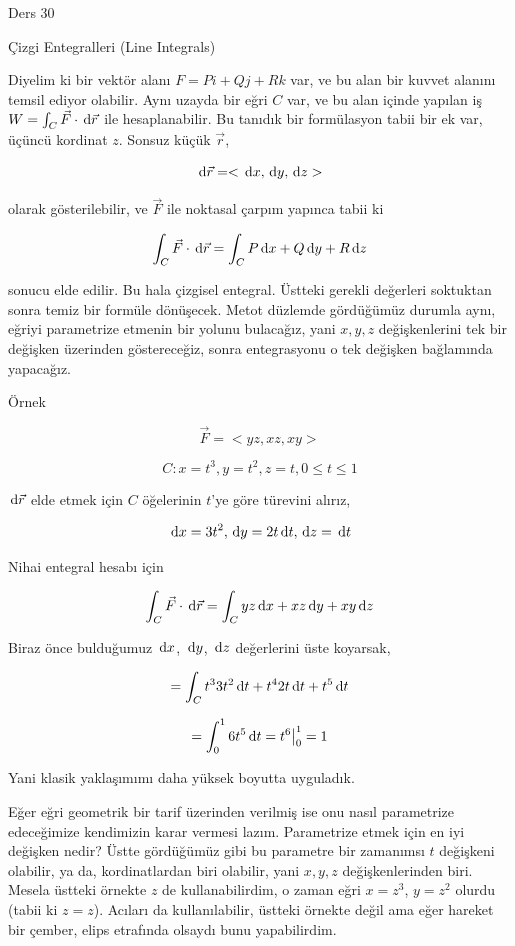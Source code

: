 \documentclass[12pt,fleqn]{article}\usepackage{../../common}
\begin{document}
Ders 30

Çizgi Entegralleri (Line Integrals)

Diyelim ki bir vektör alanı $F = P i + Qj + Rk$ var, ve bu alan bir kuvvet
alanını temsil ediyor olabilir. Aynı uzayda bir eğri $C$ var, ve bu alan içinde
yapılan iş $W = \int_C \vec{F} \cdot \,\mathrm{d} \vec{r}$ ile hesaplanabilir. Bu tanıdık
bir formülasyon tabii bir ek var, üçüncü kordinat $z$. Sonsuz küçük $\vec{r}$,

$$
\,\mathrm{d}\vec{r} = < \,\mathrm{d} x, \,\mathrm{d} y, \,\mathrm{d} z >
$$

olarak gösterilebilir, ve $\vec{F}$ ile noktasal çarpım yapınca tabii ki

$$
\int_C \vec{F} \cdot \,\mathrm{d} \vec{r} =
\int_C P \,\mathrm{d} x + Q \,\mathrm{d} y + R \,\mathrm{d} z
$$

sonucu elde edilir. Bu hala çizgisel entegral. Üstteki gerekli değerleri
soktuktan sonra temiz bir formüle dönüşecek. Metot düzlemde gördüğümüz durumla
aynı, eğriyi parametrize etmenin bir yolunu bulacağız, yani $x,y,z$
değişkenlerini tek bir değişken üzerinden göstereceğiz, sonra entegrasyonu
o tek değişken bağlamında yapacağız.

Örnek

$$
\vec{F} = < yz, xz, xy >
$$

$$
C: x=t^3, y=t^2, z=t, 0 \le t \le 1
$$

$\,\mathrm{d}\vec{r}$ elde etmek için $C$ öğelerinin $t$'ye göre türevini alırız,

$$
\,\mathrm{d} x = 3t^2, \,\mathrm{d} y = 2t \,\mathrm{d} t, \,\mathrm{d} z = \,\mathrm{d} t
$$

Nihai entegral hesabı için 

$$
\int_C \vec{F} \cdot \,\mathrm{d} \vec{r} =
\int_C yz \,\mathrm{d} x + xz \,\mathrm{d} y + xy \,\mathrm{d} z
$$

Biraz önce bulduğumuz $\,\mathrm{d} x$, $\,\mathrm{d} y$, $\,\mathrm{d} z$ değerlerini üste koyarsak,

$$
= \int_C t^3 3t^2 \,\mathrm{d} t + t^4 2t \,\mathrm{d} t + t^5 \,\mathrm{d} t
$$

$$
= \int_{0}^{1} 6 t^5 \,\mathrm{d} t = t^6 \big\vert_{0}^{1} = 1
$$

Yani klasik yaklaşımımı daha yüksek boyutta uyguladık.

Eğer eğri geometrik bir tarif üzerinden verilmiş ise onu nasıl parametrize
edeceğimize kendimizin karar vermesi lazım. Parametrize etmek için en iyi
değişken nedir? Üstte gördüğümüz gibi bu parametre bir zamanımsı $t$ değişkeni
olabilir, ya da, kordinatlardan biri olabilir, yani $x,y,z$ değişkenlerinden
biri. Mesela üstteki örnekte $z$ de kullanabilirdim, o zaman eğri $x=z^3$,
$y=z^2$ olurdu (tabii ki $z=z$). Acıları da kullanılabilir, üstteki örnekte
değil ama eğer hareket bir çember, elips etrafında olsaydı bunu yapabilirdim.
\end{document}
